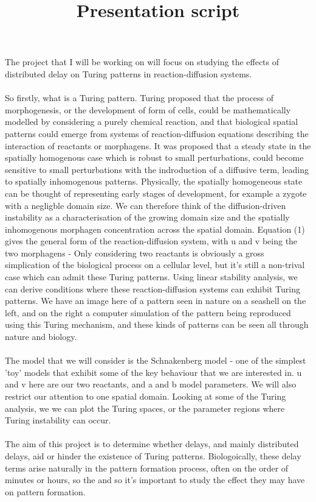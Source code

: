 \documentclass{article}
\title{Presentation script}
\begin{document}
The project that I will be working on will focus on studying the effects of distributed delay on Turing patterns in reaction-diffusion systems.
\\\\
So firstly, what is a Turing pattern. Turing proposed that the process of morphogenesis, or the development of form of cells, could be mathematically modelled by considering a purely chemical reaction, and that biological spatial patterns could emerge from systems of reaction-diffusion equations describing the interaction of reactants or morphagens. It was proposed that a steady state in the spatially homogenous case which is robust to small perturbations, could become sensitive to small perturbations with the indroduction of a diffusive term, leading to spatially inhomogenous patterns.
Physically, the spatially homogeneous state can be thought of representing early stages of development, for example a zygote with a negligble domain size. We can therefore think of the diffusion-driven instability as a characterisation of the growing domain size and the spatially inhomogenous morphagen concentration across the spatial domain. Equation (1) gives the general form of the reaction-diffusion system, with u and v being the two morphagens - Only considering two reactants is obviously a gross simplication of the biological process on a cellular level, but it's still a non-trival case which can admit these Turing patterns.
Using linear stability analysis, we can derive conditions where these reaction-diffusion systems can exhibit Turing patterns.
We have an image here of a pattern seen in nature on a seashell on the left, and on the right a computer simulation of the pattern being reproduced using this Turing mechanism, and these kinds of patterns can be seen all through nature and biology.
\\\\
The model that we will consider is the Schnakenberg model - one of the simplest 'toy' models that exhibit some of the key behaviour that we are interested in.
u and v here are our two reactants, and a and b model parameters. We will also restrict our attention to one spatial domain.
Looking at some of the Turing analysis, we we can plot the Turing spaces, or the parameter regions where Turing instability can occur.
\\\\
The aim of this project is to determine whether delays, and mainly distributed delays, aid or hinder the existence of Turing patterns. Biologoically, these delay terms arise naturally in the pattern formation process, often on the order of minutes or hours, so the and so it's important to study the effect they may have on pattern formation.
\end{document}
